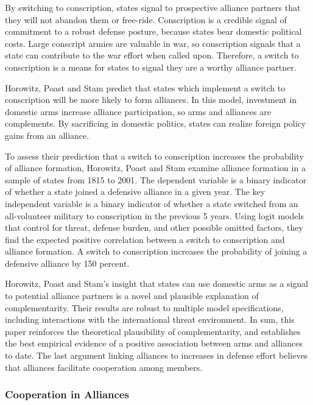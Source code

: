 \documentclass[12pt]{article}
\begin{document}
By switching to conscription, states signal to prospective alliance partners that they will not abandon them or free-ride. 
Conscription is a credible signal of commitment to a robust defense posture, because states bear domestic political costs.
Large conscript armies are valuable in war, so conscription signals that a state can contribute to the war effort when called upon. 
Therefore, a switch to conscription is a means for states to signal they are a worthy alliance partner. 


Horowitz, Poast and Stam predict that states which implement a switch to conscription will be more likely to form alliances. 
In this model, investment in domestic arms increase alliance participation, so arms and alliances are complements. 
By sacrificing in domestic politics, states can realize foreign policy gains from an alliance. 


To assess their prediction that a switch to conscription increases the probability of alliance formation, Horowitz, Poast and Stam examine alliance formation in a sample of states from 1815 to 2001. 
The dependent variable is a binary indicator of whether a state joined a defensive alliance in a given year. 
The key independent variable is a binary indicator of whether a state switched from an all-volunteer military to conscription in the previous 5 years. 
Using logit models that control for threat, defense burden, and other possible omitted factors, they find the expected positive correlation between a switch to conscription and alliance formation. 
A switch to conscription increases the probability of joining a defensive alliance by 150 percent. 


Horowitz, Poast and Stam's insight that states can use domestic arms as a signal to potential alliance partners is a novel and plausible explanation of complementarity. 
Their results are robust to multiple model specifications, including interactions with the international threat environment. 
In sum, this paper reinforces the theoretical plausibility of complementarity, and  establishes the best empirical evidence of a positive association between arms and alliances to date. 
The last argument linking alliances to increases in defense effort believes that alliances facilitate cooperation among members.  



\subsubsection{Cooperation in Alliances} 
\end{document}

